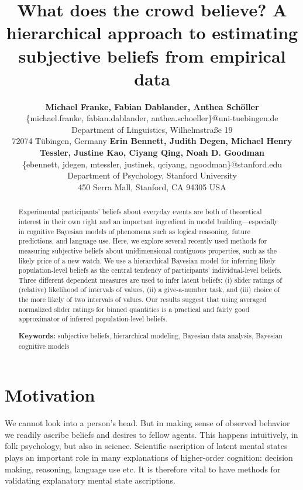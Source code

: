 \documentclass[10pt,letterpaper]{article}
\title{What does the crowd believe? A hierarchical approach to estimating subjective beliefs
  from empirical data}
\author{{\large \bf Michael Franke, Fabian Dablander, Anthea Sch\"{o}ller} \\
  \{michael.franke, fabian.dablander, anthea.schoeller\}@uni-tuebingen.de \\
  Department of Linguistics, Wilhelmstra\ss e 19 \\
  72074 T\"{u}bingen, Germany \AND
  {\large \bf Erin Bennett, Judith Degen, Michael Henry Tessler, Justine Kao, Ciyang Qing, Noah D. Goodman}\\
  \{ebennett, jdegen, mtessler, justinek, qciyang, ngoodman\}@stanford.edu \\
  Department of Psychology, Stanford University \\
  450 Serra Mall, Stanford, CA 94305 USA }
\begin{document}
\maketitle

\begin{abstract}
  Experimental participants' beliefs about everyday events are both of theoretical interest in
  their own right and an important ingredient in model building---especially in cognitive
  Bayesian models of phenomena such as logical reasoning, future predictions, and language
  use. Here, we explore several recently used methods for measuring subjective beliefs about
  unidimensional contiguous properties, such as the likely price of a new watch. We use a
  hierarchical Bayesian model for inferring likely population-level beliefs as the central
  tendency of participants' individual-level beliefs.  Three different dependent measures are
  used to infer latent beliefs: (i) slider ratings of (relative) likelihood of intervals of
  values, (ii) a give-a-number task, and (iii) choice of the more likely of two intervals of
  values. Our results suggest that using averaged normalized slider ratings for binned
  quantities is a practical and fairly good approximator of inferred population-level beliefs.

  \textbf{Keywords:} subjective beliefs, hierarchical modeling, Bayesian data analysis,
  Bayesian cognitive models
\end{abstract}




\section{Motivation}

We cannot look into a person's head. But in making sense of observed behavior we readily
ascribe beliefs and desires to fellow agents. This happens intuitively, in folk psychology, but
also in science. Scientific ascription of latent mental states plays an important role in many
explanations of higher-order cognition: decision making, reasoning, language use etc. It is
therefore vital to have methods for validating explanatory mental state ascriptions.
\end{document}
